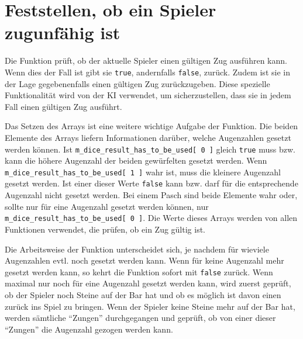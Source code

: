 \section{Feststellen, ob ein Spieler zugunfähig ist}
\label{topic:is_valid_move_possible} Die Funktion  prüft, ob der aktuelle Spieler einen gültigen Zug ausführen kann. Wenn dies der Fall ist gibt sie \lstinline$true$, andernfalls \lstinline$false$, zurück. Zudem ist sie in der Lage gegebenenfalls einen gültigen Zug zurückzugeben. Diese spezielle Funktionalität wird von der KI verwendet, um sicherzustellen, dass sie in jedem Fall einen gültigen Zug ausführt.

\label{topic:m_dice_result_has_to_be_used} Das Setzen des Arrays  ist eine weitere wichtige Aufgabe der Funktion. Die beiden Elemente des Arrays liefern Informationen darüber, welche Augenzahlen gesetzt werden können. Ist \lstinline$m_dice_result_has_to_be_used[ 0 ]$ gleich \lstinline$true$ muss bzw. kann die höhere Augenzahl der beiden gewürfelten gesetzt werden. Wenn \lstinline$m_dice_result_has_to_be_used[ 1 ]$ wahr ist, muss die kleinere Augenzahl gesetzt werden. Ist einer dieser Werte \lstinline$false$ kann bzw. darf für die entsprechende Augenzahl nicht gesetzt werden. Bei einem Pasch sind beide Elemente wahr oder, sollte nur für eine Augenzahl gesetzt werden können, nur \lstinline$m_dice_result_has_to_be_used[ 0 ]$. Die Werte dieses Arrays werden von allen Funktionen verwendet, die prüfen, ob ein Zug gültig ist.

Die Arbeitsweise der Funktion  unterscheidet sich, je nachdem für wieviele Augenzahlen evtl. noch gesetzt werden kann. Wenn für keine Augenzahl mehr gesetzt werden kann, so kehrt die Funktion sofort mit \lstinline$false$ zurück. Wenn maximal nur noch für eine Augenzahl gesetzt werden kann, wird zuerst geprüft, ob der Spieler noch Steine auf der Bar hat und ob es möglich ist davon einen zurück ins Spiel zu bringen. Wenn der Spieler keine Steine mehr auf der Bar hat, werden sämtliche "`Zungen"' durchgegangen und geprüft, ob von einer dieser "`Zungen"' die Augenzahl gezogen werden kann.

